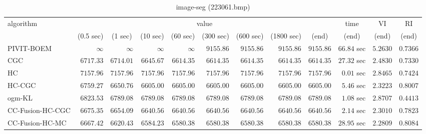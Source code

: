 \begin{table}[H]
\scriptsize
\centering
\caption{image-seg (223061.bmp)}
\label{tab:anytimetable-image-seg-223061.bmp}
\begin{tabular}{lrrrrrrrrrrr}
\toprule
           algorithm &                                   \multicolumn{8}{c}{value} & \multicolumn{1}{c}{time}    & \multicolumn{1}{c}{VI}  & \multicolumn{1}{c}{RI} \\  
\cmidrule(lr){2-9}\cmidrule(lr){10-10} \cmidrule(lr){11-11} \cmidrule(lr){12-12}   
                     & \multicolumn{1}{c}{(0.5 sec)} & \multicolumn{1}{c}{(1 sec)} & \multicolumn{1}{c}{(10 sec)} & \multicolumn{1}{c}{(60 sec)} & \multicolumn{1}{c}{(300 sec)} & \multicolumn{1}{c}{(600 sec)} & \multicolumn{1}{c}{(1800 sec)} & \multicolumn{1}{c}{(end)} & \multicolumn{1}{c}{(end)}    & \multicolumn{1}{c}{(end)}   & \multicolumn{1}{c}{(end)}  \\ \midrule 
          PIVIT-BOEM & $\infty$ & $\infty$ & $\infty$ & $\infty$ & $      9155.86$ & $      9155.86$ & $      9155.86$ & $      9155.86$ & $        66.84$ sec    & $       5.2630$  & $       0.7366$ \\ 
                 CGC & $      6717.33$ & $      6714.01$ & $      6645.67$ & $      6614.35$ & $      6614.35$ & $      6614.35$ & $      6614.35$ & $      6614.35$ & $        27.32$ sec    & $       2.4830$  & $       0.7330$ \\ 
                  HC & $      7157.96$ & $      7157.96$ & $      7157.96$ & $      7157.96$ & $      7157.96$ & $      7157.96$ & $      7157.96$ & $      7157.96$ & $         0.01$ sec    & $       2.8465$  & $       0.7424$ \\ 
              HC-CGC & $      6759.27$ & $      6650.76$ & $      6605.00$ & $      6605.00$ & $      6605.00$ & $      6605.00$ & $      6605.00$ & $      6605.00$ & $         5.46$ sec    & $       2.3223$  & $       0.8007$ \\ 
              ogm-KL & $      6823.53$ & $      6789.08$ & $      6789.08$ & $      6789.08$ & $      6789.08$ & $      6789.08$ & $      6789.08$ & $      6789.08$ & $         1.08$ sec    & $       2.8707$  & $       0.4413$ \\ 
    CC-Fusion-HC-CGC & $      6675.35$ & $      6654.09$ & $      6640.56$ & $      6640.56$ & $      6640.56$ & $      6640.56$ & $      6640.56$ & $      6640.56$ & $         2.14$ sec    & $       2.3010$  & $       0.7823$ \\ 
     CC-Fusion-HC-MC & $      6667.42$ & $      6620.43$ & $      6584.23$ & $      6580.38$ & $      6580.38$ & $      6580.38$ & $      6580.38$ & $      6580.38$ & $        28.95$ sec    & $       2.2809$  & $       0.8084$ \\ 

\end{tabular}
\end{table}
